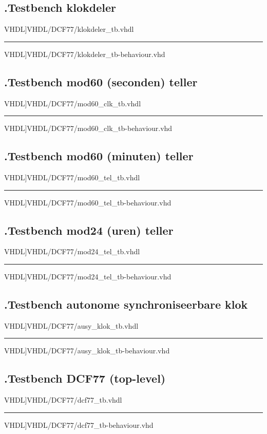 \subsection*{\label{code: klokdeler_tb}\thesubsection.\quad Testbench klokdeler}
\scriptsize 
 VHDL]{VHDL/DCF77/klokdeler_tb.vhdl}
\hrule
 VHDL]{VHDL/DCF77/klokdeler_tb-behaviour.vhd}
\normalsize

\subsection*{\label{code: mod60_clk_tb}\thesubsection.\quad Testbench mod60 (seconden) teller}
\scriptsize 
 VHDL]{VHDL/DCF77/mod60_clk_tb.vhdl}
\hrule
 VHDL]{VHDL/DCF77/mod60_clk_tb-behaviour.vhd}
\normalsize

\subsection*{\label{code: mod60_tel_tb}\thesubsection.\quad Testbench mod60 (minuten) teller}
\scriptsize 
 VHDL]{VHDL/DCF77/mod60_tel_tb.vhdl}
\hrule
 VHDL]{VHDL/DCF77/mod60_tel_tb-behaviour.vhd}
\normalsize

\subsection*{\label{code: mod24_tel_tb}\thesubsection.\quad Testbench mod24 (uren) teller}
\scriptsize 
 VHDL]{VHDL/DCF77/mod24_tel_tb.vhdl}
\hrule
 VHDL]{VHDL/DCF77/mod24_tel_tb-behaviour.vhd}
\normalsize

\subsection*{\label{code: ausy_klok_tb}\thesubsection.\quad Testbench autonome synchroniseerbare klok}
\scriptsize 
 VHDL]{VHDL/DCF77/ausy_klok_tb.vhdl}
\hrule 
 VHDL]{VHDL/DCF77/ausy_klok_tb-behaviour.vhd}
\normalsize

\subsection*{\label{code: dcf77_tb}\thesubsection.\quad Testbench DCF77 (top-level)}
\scriptsize 
 VHDL]{VHDL/DCF77/dcf77_tb.vhdl}
\hrule
 VHDL]{VHDL/DCF77/dcf77_tb-behaviour.vhd}
\normalsize
\newpage


